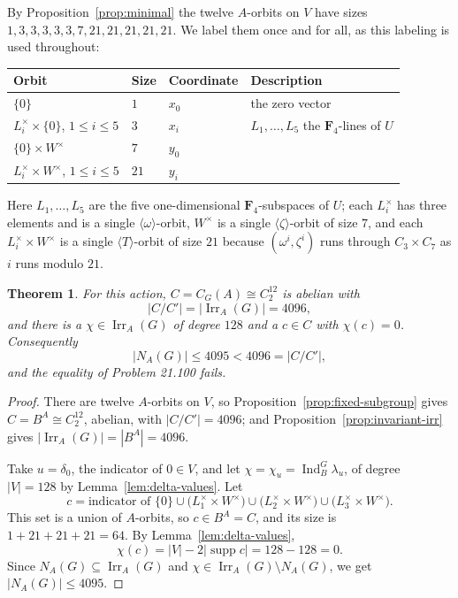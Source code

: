 \documentclass[11pt,a4paper,reqno]{amsart}
\newtheorem{theorem}{Theorem}[section]
\theoremstyle{definition}
\theoremstyle{remark}
\newcommand{\F}{\mathbf F}
\newcommand{\Irr}{\operatorname{Irr}}
\newcommand{\Ind}{\operatorname{Ind}}
\newcommand{\supp}{\operatorname{supp}}
\begin{document}
By Proposition~\ref{prop:minimal} the twelve $A$-orbits on $V$ have
sizes $1,3,3,3,3,3,7,21,21,21,21,21$.  We label them once and for all,
as this labeling is used throughout:

\begin{center}
\begin{tabular}{@{}llll@{}}
\toprule
Orbit & Size & Coordinate & Description\\
\midrule
$\{0\}$ & $1$ & $x_0$ & the zero vector\\
$L_i^\times\times\{0\}$, $1\le i\le5$ & $3$ & $x_i$
 & $L_1,\dots,L_5$ the $\F_4$-lines of $U$\\
$\{0\}\times W^\times$ & $7$ & $y_0$ &\\
$L_i^\times\times W^\times$, $1\le i\le5$ & $21$ & $y_i$ &\\
\bottomrule
\end{tabular}
\end{center}

Here $L_1,\dots,L_5$ are the five one-dimensional $\F_4$-subspaces of
$U$; each $L_i^\times$ has three elements and is a single
$\langle\omega\rangle$-orbit, $W^\times$ is a single
$\langle\zeta\rangle$-orbit of size $7$, and each
$L_i^\times\times W^\times$ is a single $\langle T\rangle$-orbit of
size $21$ because $(\omega^i,\zeta^i)$ runs through
$C_3\times C_7$ as $i$ runs modulo $21$.

\begin{theorem}\label{thm:counterexample}
For this action, $C=C_G(A)\cong C_2^{12}$ is abelian with
\[
 |C/C'|=|\Irr_A(G)|=4096 ,
\]
and there is a $\chi\in\Irr_A(G)$ of degree $128$ and a $c\in C$ with
$\chi(c)=0$.  Consequently
\[
 |N_A(G)|\le4095<4096=|C/C'| ,
\]
and the equality of Problem 21.100 fails.
\end{theorem}

\begin{proof}
There are twelve $A$-orbits on $V$, so
Proposition~\ref{prop:fixed-subgroup} gives $C=B^A\cong C_2^{12}$,
abelian, with $|C/C'|=4096$; and
Proposition~\ref{prop:invariant-irr} gives $|\Irr_A(G)|=|B^A|=4096$.

Take $u=\delta_0$, the indicator of $0\in V$, and let
$\chi=\chi_u=\Ind_B^G\lambda_u$, of degree $|V|=128$ by
Lemma~\ref{lem:delta-values}.  Let
\[
 c=\text{indicator of }
 \{0\}\cup\bigl(L_1^\times\times W^\times\bigr)
 \cup\bigl(L_2^\times\times W^\times\bigr)
 \cup\bigl(L_3^\times\times W^\times\bigr).
\]
This set is a union of $A$-orbits, so $c\in B^A=C$, and its size is
$1+21+21+21=64$.  By Lemma~\ref{lem:delta-values},
\[
 \chi(c)=|V|-2|\supp c|=128-128=0 .
\]
Since $N_A(G)\subseteq\Irr_A(G)$ and $\chi\in\Irr_A(G)\setminus
N_A(G)$, we get $|N_A(G)|\le4095$.
\end{proof}
\end{document}

